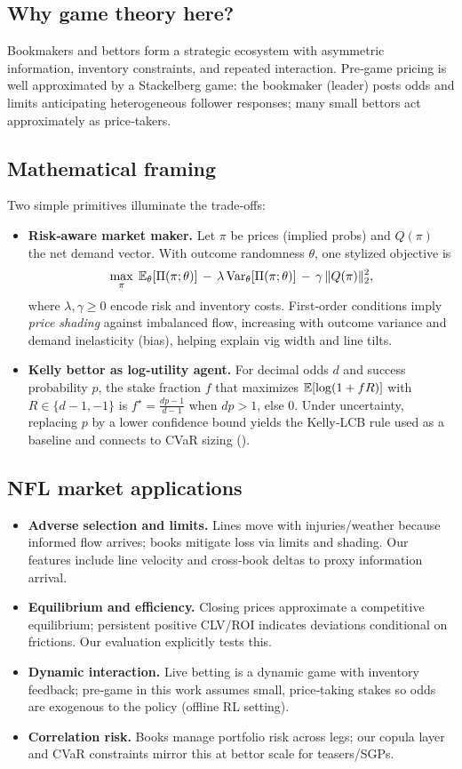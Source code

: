\subsection{Why game theory here?}
\begingroup\sloppy
Bookmakers and bettors form a strategic ecosystem with asymmetric information, inventory constraints, and repeated interaction. Pre‑game pricing is well approximated by a Stackelberg game: the bookmaker (leader) posts odds and limits anticipating heterogeneous follower responses; many small bettors act approximately as price‑takers.

\subsection{Mathematical framing}
Two simple primitives illuminate the trade‑offs:
\begin{itemize}
  \item \textbf{Risk‑aware market maker.} Let $\pi$ be prices (implied probs) and $Q(\pi)$ the net demand vector. With outcome randomness $\theta$, one stylized objective is
  \[
  \max_{\pi}\; \mathbb{E}_\theta[\Pi(\pi;\theta)]\,-\,\lambda\,\mathrm{Var}_\theta[\Pi(\pi;\theta)]\,-\,\gamma\,\|Q(\pi)\|_2^2,
  \]
  where $\lambda,\gamma\ge 0$ encode risk and inventory costs. First‑order conditions imply \emph{price shading} against imbalanced flow, increasing with outcome variance and demand inelasticity (bias), helping explain vig width and line tilts.
  \item \textbf{Kelly bettor as log‑utility agent.} For decimal odds $d$ and success probability $p$, the stake fraction $f$ that maximizes $\mathbb{E}[\log(1+fR)]$ with $R\in\{d-1,-1\}$ is $f^\star=\tfrac{dp-1}{d-1}$ when $dp>1$, else $0$. Under uncertainty, replacing $p$ by a lower confidence bound yields the Kelly‑LCB rule used as a baseline and connects to CVaR sizing ().
\end{itemize}

\subsection{NFL market applications}
\begin{itemize}
  \item \textbf{Adverse selection and limits.} Lines move with injuries/weather because informed flow arrives; books mitigate loss via limits and shading. Our features include line velocity and cross‑book deltas to proxy information arrival.
  \item \textbf{Equilibrium and efficiency.} Closing prices approximate a competitive equilibrium; persistent positive CLV/ROI indicates deviations conditional on frictions. Our evaluation explicitly tests this.
  \item \textbf{Dynamic interaction.} Live betting is a dynamic game with inventory feedback; pre‑game in this work assumes small, price‑taking stakes so odds are exogenous to the policy (offline RL setting).
  \item \textbf{Correlation risk.} Books manage portfolio risk across legs; our copula layer and CVaR constraints mirror this at bettor scale for teasers/SGPs.
\end{itemize}

